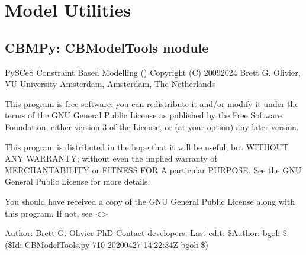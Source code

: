 \documentclass[letterpaper,12pt,english]{sphinxmanual}
\begin{document}
\section{Model Utilities}
\label{\detokenize{api/visualization:model-utilities}}

\subsection{CBMPy: CBModelTools module}
\label{\detokenize{api/visualization:cbmpy-cbmodeltools-module}}\label{\detokenize{api/visualization:module-cbmpy.CBModelTools}}
\sphinxAtStartPar
PySCeS Constraint Based Modelling ()
Copyright (C) 2009\sphinxhyphen{}2024 Brett G. Olivier, VU University Amsterdam, Amsterdam, The Netherlands

\sphinxAtStartPar
This program is free software: you can redistribute it and/or modify
it under the terms of the GNU General Public License as published by
the Free Software Foundation, either version 3 of the License, or
(at your option) any later version.

\sphinxAtStartPar
This program is distributed in the hope that it will be useful,
but WITHOUT ANY WARRANTY; without even the implied warranty of
MERCHANTABILITY or FITNESS FOR A particular PURPOSE.  See the
GNU General Public License for more details.

\sphinxAtStartPar
You should have received a copy of the GNU General Public License
along with this program.  If not, see \textless{}\textgreater{}

\sphinxAtStartPar
Author: Brett G. Olivier PhD
Contact developers: 
Last edit: \$Author: bgoli \$ (\$Id: CBModelTools.py 710 2020\sphinxhyphen{}04\sphinxhyphen{}27 14:22:34Z bgoli \$)
\end{document}
